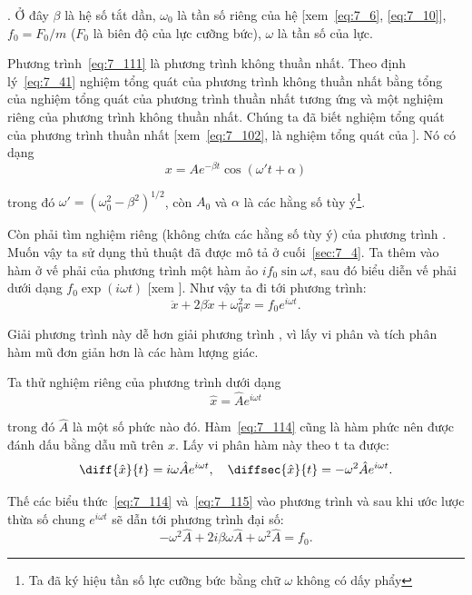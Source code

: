 . Ở đây $\beta$ là hệ số tắt dần, $\omega_0$ là tần số riêng của hệ [xem~\eqref{eq:7_6}, \eqref{eq:7_10}], $f_0=F_0/m$ ($F_0$ là biên độ của lực cưỡng bức), $\omega$ là tần số của lực.

Phương trình~\eqref{eq:7_111} là phương trình không thuần nhất. Theo định lý~\eqref{eq:7_41} nghiệm tổng quát của phương trình không thuần nhất bằng tổng của nghiệm tổng quát của phương trình thuần nhất tương ứng và một nghiệm riêng của phương trình không thuần nhất. Chúng ta đã biết nghiệm tổng quát của phương trình thuần nhất [xem~\eqref{eq:7_102}, là nghiệm tổng quát của ]. Nó có dạng
\begin{equation}\label{eq:7_112}
	x = A e^{-\beta t} \cos(\omega' t + \alpha)
\end{equation}

\noindent
trong đó $\omega'=\left(\omega_0^2 - \beta^2\right)^{1/2}$, còn $A_0$ và $\alpha$ là các hằng số tùy ý\footnote{Ta đã ký hiệu tần số lực cưỡng bức bằng chữ $\omega$ không có dấy phẩy}.

Còn phải tìm nghiệm riêng (không chứa các hằng số tùy ý) của phương trình . Muốn vậy ta sử dụng thủ thuật đã được mô tả ở cuối~\ref{sec:7_4}. Ta thêm vào hàm ở vế phải của phương trình  một hàm ảo $if_0\sin\omega t$, sau đó biểu diễn vế phải dưới dạng $f_0\exp(i\omega t)$ [xem ]. Như vậy ta đi tới phương trình:
\begin{equation}\label{eq:7_113}
	\ddot{x} + 2\beta\dot{x} + \omega_0^2 x = f_0 e^{i\omega t}.
\end{equation}

\noindent
Giải phương trình này dễ hơn giải phương trình , vì lấy vi phân và tích phân hàm mũ đơn giản hơn là các hàm lượng giác.

Ta thử nghiệm riêng của phương trình  dưới dạng
\begin{equation}\label{eq:7_114}
	\hat{x} = \hat{A} e^{i\omega t}
\end{equation}

\noindent
trong đó $\hat{A}$ là một số phức nào đó. Hàm~\eqref{eq:7_114} cũng là hàm phức nên được đánh dấu bằng dẫu mũ trên $x$. Lấy vi phân hàm này theo t ta được:
\begin{equation}\label{eq:7_115}
	\diff{\hat{x}}{t} = i\omega \hat{A} e^{i\omega t},\quad \diffsec{\hat{x}}{t} = -\omega^2 \hat{A} e^{i\omega t}.
\end{equation}

\noindent
Thế các biểu thức~\eqref{eq:7_114} và~\eqref{eq:7_115} vào phương trình  và sau khi ước lược thừa số chung $e^{i\omega t}$ sẽ dẫn tới phương trình đại số:
\begin{equation*}
	- \omega^2 \hat{A} + 2i\beta\omega\hat{A} + \omega^2\hat{A} = f_0.
\end{equation*}

